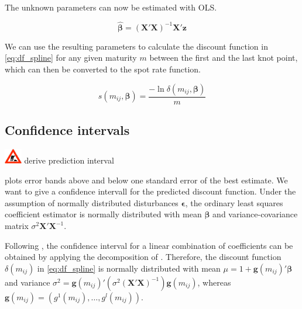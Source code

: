        
The unknown parameters can now be estimated with OLS.
	
\begin{equation}
\label{eq:paramspline}
\bm{\hat \beta}= \left( \bm{X}' \bm{X}\right )^{-1}\bm{X}' \bm{z}
\end{equation}


We can use the resulting parameters to calculate the discount function in \eqref{eq:df_spline} for any given maturity $m$ between the first and the last knot point, which can then be converted to the spot rate function.



\begin{equation}
  \label{eq:transformdf}
  s(m_{ij},\bm{\beta}) = \frac{-\ln \delta(m_{ij},\bm{\beta})}{m}
\end{equation}


\subsection{Confidence intervals}\includegraphics[width=0.3in]{baustelle} derive prediction interval



\cite{McCulloch1975} plots error bands above and below one standard error of the best estimate. We want to give a confidence intervall for the predicted discount function. Under the assumption of normally distributed disturbances $\bm{\epsilon}$, the ordinary least squares coefficient estimator is normally distributed with mean $\bm{\beta}$ and variance-covariance matrix $\sigma^2\bm{X}'\bm{X}^{-1}$. 

Following \cite{Greene2002}, the confidence interval for a linear combination of coefficients can be obtained by applying the decomposition of \cite{Oaxaca1973}. Therefore, the discount function $\delta(m_{ij})$ in \eqref{eq:df_spline} is normally distributed with mean $\mu = 1+\bm{g}(m_{ij})'\bm{\beta}$ and variance $\sigma^2 = \bm{g}(m_{ij})'\left(\sigma^2(\bm{X' X})^{-1} \right)\bm{g}(m_{ij})$, whereas $\bm{g}(m_{ij})= \left(g^1(m_{ij}), \dots, g^l(m_{ij}) \right)$.


